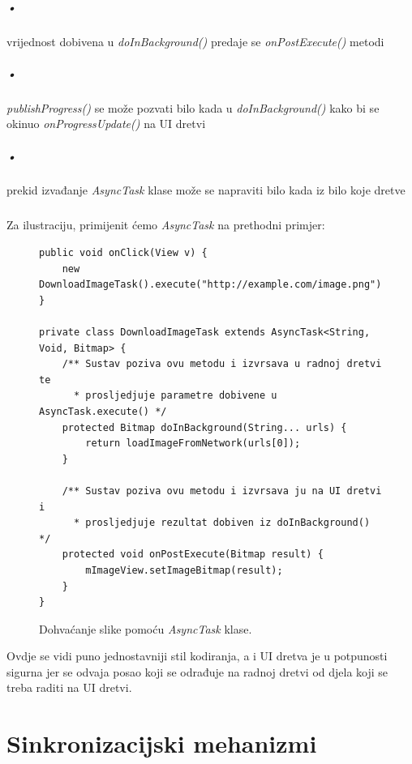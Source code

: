 \documentclass[times, utf8, zavrsni]{fer}
\begin{document}
\paragraph{•}
vrijednost dobivena u \textit{doInBackground()} predaje se \textit{onPostExecute()} metodi
\paragraph{•}
\textit{publishProgress()} se može pozvati bilo kada u \textit{doInBackground()} kako bi se okinuo \textit{onProgressUpdate()} na UI dretvi
\paragraph{•}
prekid izvađanje \textit{AsyncTask} klase može se napraviti bilo kada iz bilo koje dretve\newpage

\paragraph{}
Za ilustraciju, primijenit ćemo \textit{AsyncTask} na prethodni primjer:

\begin{figure}[ht!]
\begin{lstlisting}
public void onClick(View v) {
    new DownloadImageTask().execute("http://example.com/image.png");
}

private class DownloadImageTask extends AsyncTask<String, Void, Bitmap> {
    /** Sustav poziva ovu metodu i izvrsava u radnoj dretvi te
      * prosljedjuje parametre dobivene u AsyncTask.execute() */
    protected Bitmap doInBackground(String... urls) {
        return loadImageFromNetwork(urls[0]);
    }

    /** Sustav poziva ovu metodu i izvrsava ju na UI dretvi i
      * prosljedjuje rezultat dobiven iz doInBackground() */
    protected void onPostExecute(Bitmap result) {
        mImageView.setImageBitmap(result);
    }
}
\end{lstlisting}
\caption{Dohvaćanje slike pomoću \textit{AsyncTask} klase.}
\label{overflow}
\end{figure}

Ovdje se vidi puno jednostavniji stil kodiranja, a i UI dretva je u potpunosti sigurna jer se odvaja posao koji se odrađuje na radnoj dretvi od djela koji se treba raditi na UI dretvi.\newpage

\chapter{Sinkronizacijski mehanizmi}
\end{document}
